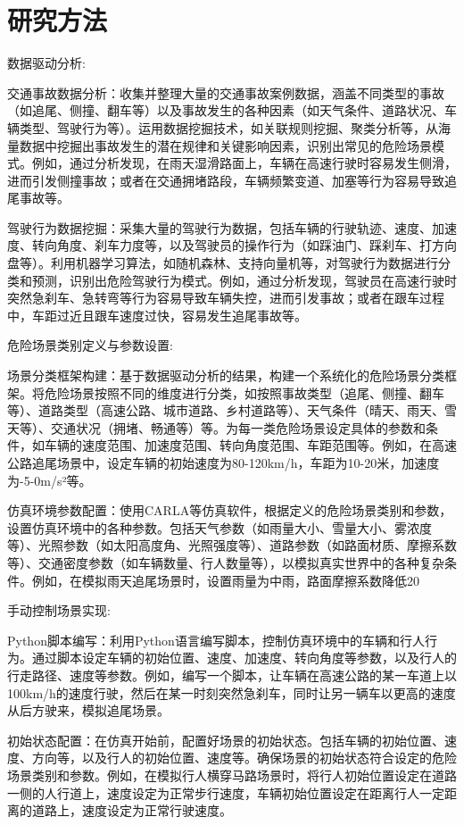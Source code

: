 \section{研究方法}

数据驱动分析:

交通事故数据分析：收集并整理大量的交通事故案例数据，涵盖不同类型的事故（如追尾、侧撞、翻车等）以及事故发生的各种因素（如天气条件、道路状况、车辆类型、驾驶行为等）。运用数据挖掘技术，如关联规则挖掘、聚类分析等，从海量数据中挖掘出事故发生的潜在规律和关键影响因素，识别出常见的危险场景模式。例如，通过分析发现，在雨天湿滑路面上，车辆在高速行驶时容易发生侧滑，进而引发侧撞事故；或者在交通拥堵路段，车辆频繁变道、加塞等行为容易导致追尾事故等。

驾驶行为数据挖掘：采集大量的驾驶行为数据，包括车辆的行驶轨迹、速度、加速度、转向角度、刹车力度等，以及驾驶员的操作行为（如踩油门、踩刹车、打方向盘等）。利用机器学习算法，如随机森林、支持向量机等，对驾驶行为数据进行分类和预测，识别出危险驾驶行为模式。例如，通过分析发现，驾驶员在高速行驶时突然急刹车、急转弯等行为容易导致车辆失控，进而引发事故；或者在跟车过程中，车距过近且跟车速度过快，容易发生追尾事故等。

危险场景类别定义与参数设置:

场景分类框架构建：基于数据驱动分析的结果，构建一个系统化的危险场景分类框架。将危险场景按照不同的维度进行分类，如按照事故类型（追尾、侧撞、翻车等）、道路类型（高速公路、城市道路、乡村道路等）、天气条件（晴天、雨天、雪天等）、交通状况（拥堵、畅通等）等。为每一类危险场景设定具体的参数和条件，如车辆的速度范围、加速度范围、转向角度范围、车距范围等。例如，在高速公路追尾场景中，设定车辆的初始速度为80-120km/h，车距为10-20米，加速度为-5-0m/s²等。

仿真环境参数配置：使用CARLA等仿真软件，根据定义的危险场景类别和参数，设置仿真环境中的各种参数。包括天气参数（如雨量大小、雪量大小、雾浓度等）、光照参数（如太阳高度角、光照强度等）、道路参数（如路面材质、摩擦系数等）、交通密度参数（如车辆数量、行人数量等），以模拟真实世界中的各种复杂条件。例如，在模拟雨天追尾场景时，设置雨量为中雨，路面摩擦系数降低20%

手动控制场景实现:

Python脚本编写：利用Python语言编写脚本，控制仿真环境中的车辆和行人行为。通过脚本设定车辆的初始位置、速度、加速度、转向角度等参数，以及行人的行走路径、速度等参数。例如，编写一个脚本，让车辆在高速公路的某一车道上以100km/h的速度行驶，然后在某一时刻突然急刹车，同时让另一辆车以更高的速度从后方驶来，模拟追尾场景。

初始状态配置：在仿真开始前，配置好场景的初始状态。包括车辆的初始位置、速度、方向等，以及行人的初始位置、速度等。确保场景的初始状态符合设定的危险场景类别和参数。例如，在模拟行人横穿马路场景时，将行人初始位置设定在道路一侧的人行道上，速度设定为正常步行速度，车辆初始位置设定在距离行人一定距离的道路上，速度设定为正常行驶速度。


